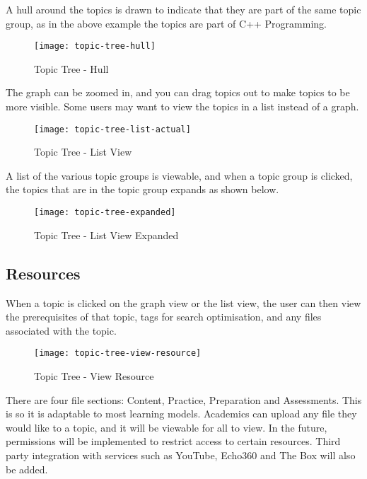 A hull around the topics is drawn to indicate that they are part of the same topic group, as in the above example the topics are part of C++ Programming.\\

\begin{figure}[h!]
    \centering
    \texttt{[image: topic-tree-hull]}
    \caption{Topic Tree - Hull}
\end{figure}

The graph can be zoomed in, and you can drag topics out to make topics to be more visible. Some users may want to view the topics in a list instead of a graph.\\

\begin{figure}[h!]
    \centering
    \texttt{[image: topic-tree-list-actual]}
    \caption{Topic Tree - List View}
\end{figure}

A list of the various topic groups is viewable, and when a topic group is clicked, the topics that are in the topic group expands as shown below.\\

\begin{figure}[h!]
    \centering
    \texttt{[image: topic-tree-expanded]}
    \caption{Topic Tree - List View Expanded}
\end{figure}

\subsection{Resources}

When a topic is clicked on the graph view or the list view, the user can then view the prerequisites of that topic, tags for search optimisation, and any files associated with the topic.

\begin{figure}[h!]
    \centering
    \texttt{[image: topic-tree-view-resource]}
    \caption{Topic Tree - View Resource}
\end{figure}

There are four file sections: Content, Practice, Preparation and Assessments. This is so it is adaptable to most learning models. Academics can upload any file they would like to a topic, and it will be viewable for all to view. In the future, permissions will be implemented to restrict access to certain resources. Third party integration with services such as YouTube, Echo360 and The Box will also be added.\\

